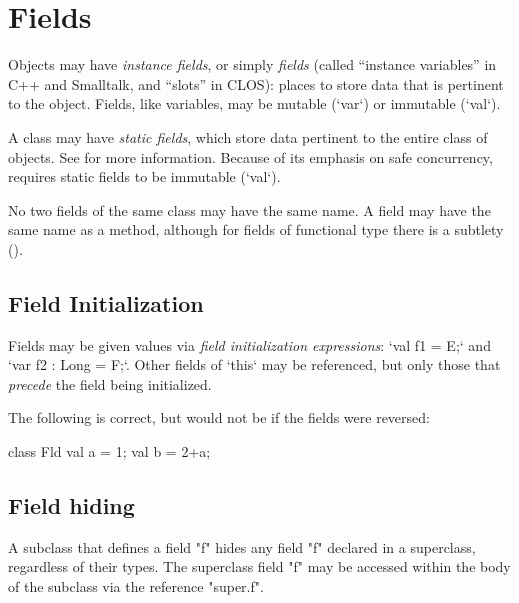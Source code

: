 \section{Fields}
\label{FieldDefinitions}

Objects may have {\em instance fields}, or simply {\em fields} (called
``instance variables'' in C++ and Smalltalk, and ``slots'' in CLOS): places to
store data that is pertinent to the object.  Fields, like variables, may be
mutable (\xcd`var`) or immutable (\xcd`val`).  

A class may have {\em static fields}, which store data pertinent to the
entire class of objects.  See  for more
information. 
Because of its emphasis on safe concurrency, \Xten{} requires static
fields to be immutable (\xcd`val`). 

No two fields of the same class may have the same name.  A field may have the
same name as a method, although for fields of functional type there is a
subtlety ().  

\subsection{Field Initialization}

Fields may be given values via {\em field initialization expressions}:
\xcd`val f1 = E;` and \xcd`var f2 : Long = F;`. Other fields of \xcd`this` may
be referenced, but only those that {\em precede} the field being initialized.


\begin{ex}The following is correct, but would not be if the fields were
reversed:

\begin{xten}
class Fld{
  val a = 1;
  val b = 2+a;
}
\end{xten}
\end{ex}

\subsection{Field hiding}
\label{sect:FieldHiding}


A subclass that defines a field \xcd"f" hides any field \xcd"f"
declared in a superclass, regardless of their types.  The
superclass field \xcd"f" may be accessed within the body of
the subclass via the reference \xcd"super.f".

